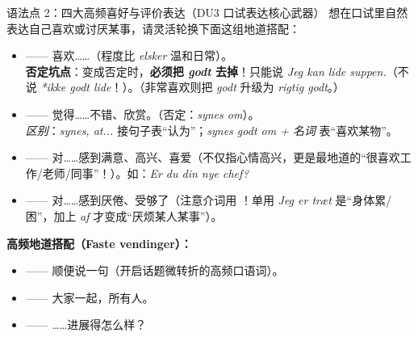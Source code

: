 \begin{grammatikbox}{语法点 2：四大高频喜好与评价表达（DU3 口试表达核心武器）}
想在口试里自然表达自己喜欢或讨厌某事，请灵活轮换下面这组地道搭配：
\begin{itemize}
  \item {} —— 喜欢……（程度比 \textit{elsker} 温和日常）。\\
    \textbf{否定坑点}：变成否定时，\textbf{必须把 \textit{godt} 去掉}！只能说 \textit{Jeg kan  lide suppen.}（不说 \textit{*ikke godt lide}！）。（非常喜欢则把 \textit{godt} 升级为 \textit{rigtig godt}。）
  \item {} —— 觉得……不错、欣赏。（否定：\textit{synes  om}）。\\
    \textit{区别}：\textit{synes, at...} 接句子表“认为”；\textit{synes godt om + 名词} 表“喜欢某物”。
  \item {} —— 对……感到满意、高兴、喜爱（不仅指心情高兴，更是最地道的“很喜欢工作/老师/同事”！）。如：\textit{Er du  din nye chef?}
  \item {} —— 对……感到厌倦、受够了（注意介词用 ！单用 \textit{Jeg er træt} 是“身体累/困”，加上 \textit{af} 才变成“厌烦某人某事”）。
\end{itemize}

\textbf{高频地道搭配（Faste vendinger）：}
\begin{itemize}
  \item {} —— 顺便说一句（开启话题微转折的高频口语词）。
  \item {} —— 大家一起，所有人。
  \item {} —— ……进展得怎么样？
\end{itemize}
\end{grammatikbox}


